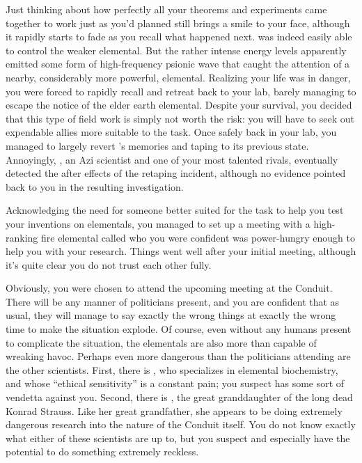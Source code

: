 \documentclass[char]{elementals}
\begin{document}
Just thinking about how perfectly all your theorems and experiments came together to work just as you'd planned still brings a smile to your face, although it rapidly starts to fade as you recall what happened next. \cDiplomat{} was indeed easily able to control the weaker elemental. But the rather intense energy levels apparently emitted some form of high-frequency psionic wave that caught the attention of a nearby, considerably more powerful, elemental. Realizing your life was in danger, you were forced to rapidly recall \cDiplomat{} and retreat back to your lab, barely managing to escape the notice of the elder earth elemental. Despite your survival, you decided that this type of field work is simply not worth the risk: you will have to seek out expendable allies more suitable to the task. Once safely back in your lab, you managed to largely revert \cDiplomat{}'s memories and taping to its previous state. Annoyingly, \cScientist{\intro}, an Azi scientist and one of your most talented rivals, eventually detected the after effects of the retaping incident, although no evidence pointed back to you in the resulting investigation.

Acknowledging the need for someone better suited for the task to help you test your inventions on elementals, you managed to set up a meeting with a high-ranking fire elemental called \cPyro{\intro} who you were confident was power-hungry enough to help you with your research. Things went well after your initial meeting, although it's quite clear you do not trust each other fully.

Obviously, you were chosen to attend the upcoming meeting at the Conduit. There will be any manner of politicians present, and you are confident that as usual, they will manage to say exactly the wrong things at exactly the wrong time to make the situation explode. Of course, even without any humans present to complicate the situation, the elementals are also more than capable of wreaking havoc. Perhaps even more dangerous than the politicians attending are the other scientists. First, there is \cScientist{}, who specializes in elemental biochemistry, and whose ``ethical sensitivity'' is a constant pain; you suspect \cScientist{\they} has some sort of vendetta against you. Second, there is \cGD{\intro}, the great granddaughter of the long dead Konrad Strauss. Like her great grandfather, she appears to be doing extremely dangerous research into the nature of the Conduit itself. You do not know exactly what either of these scientists are up to, but you suspect \cScientist{} and especially \cGD{} have the potential to do something extremely reckless.
\end{document}
